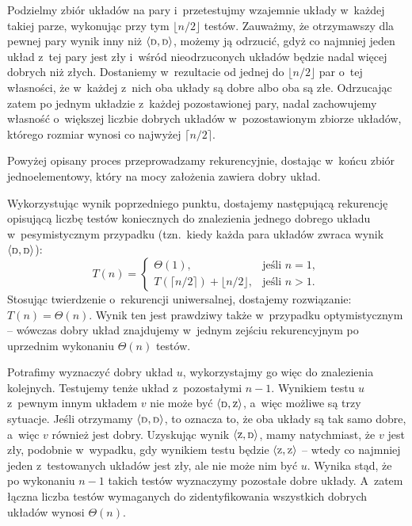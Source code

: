 Podzielmy zbiór układów na pary i~przetestujmy wzajemnie układy w~każdej takiej parze, wykonując przy tym $\lfloor n/2\rfloor$ testów. Zauważmy, że otrzymawszy dla pewnej pary wynik inny niż $\langle{\scriptstyle\rm D},{\scriptstyle\rm D}\rangle$, możemy ją odrzucić, gdyż co najmniej jeden układ z~tej pary jest zły i~wśród nieodrzuconych układów będzie nadal więcej dobrych niż złych. Dostaniemy w~rezultacie od jednej do $\lfloor n/2\rfloor$ par o~tej własności, że w~każdej z~nich oba układy są dobre albo oba są złe. Odrzucając zatem po jednym układzie z~każdej pozostawionej pary, nadal zachowujemy własność o~większej liczbie dobrych układów w~pozostawionym zbiorze układów, którego rozmiar wynosi co najwyżej $\lceil n/2\rceil$.

Powyżej opisany proces przeprowadzamy rekurencyjnie, dostając w~końcu zbiór jednoelementowy, który na mocy założenia zawiera dobry układ.

\subproblem %
Wykorzystując wynik poprzedniego punktu, dostajemy następującą rekurencję opisującą liczbę testów koniecznych do znalezienia jednego dobrego układu w~pesymistycznym przypadku (tzn.\ kiedy każda para układów zwraca wynik $\langle{\scriptstyle\rm D},{\scriptstyle\rm D}\rangle$):
\[
	T(n) =
	\begin{cases}
		\Theta(1), & \text{jeśli $n=1$}, \\
		T(\lceil n/2\rceil)+\lfloor n/2\rfloor, & \text{jeśli $n>1$}.
	\end{cases}
\]
Stosując twierdzenie o~rekurencji uniwersalnej, dostajemy rozwiązanie: $T(n)=\Theta(n)$. Wynik ten jest prawdziwy także w~przypadku optymistycznym -- wówczas dobry układ znajdujemy w~jednym zejściu rekurencyjnym po uprzednim wykonaniu $\Theta(n)$ testów.

Potrafimy wyznaczyć dobry układ $u$, wykorzystajmy go więc do znalezienia kolejnych. Testujemy tenże układ z~pozostałymi $n-1$. Wynikiem testu $u$ z~pewnym innym układem $v$ nie może być $\langle{\scriptstyle\rm D},{\scriptstyle\rm Z}\rangle$, a~więc możliwe są trzy sytuacje. Jeśli otrzymamy $\langle{\scriptstyle\rm D},{\scriptstyle\rm D}\rangle$, to oznacza to, że oba układy są tak samo dobre, a~więc $v$ również jest dobry. Uzyskując wynik $\langle{\scriptstyle\rm Z},{\scriptstyle\rm D}\rangle$, mamy natychmiast, że $v$ jest zły, podobnie w~wypadku, gdy wynikiem testu będzie $\langle{\scriptstyle\rm Z},{\scriptstyle\rm Z}\rangle$ -- wtedy co najmniej jeden z~testowanych układów jest zły, ale nie może nim być $u$. Wynika stąd, że po wykonaniu $n-1$ takich testów wyznaczymy pozostałe dobre układy. A~zatem łączna liczba testów wymaganych do zidentyfikowania wszystkich dobrych układów wynosi $\Theta(n)$.

